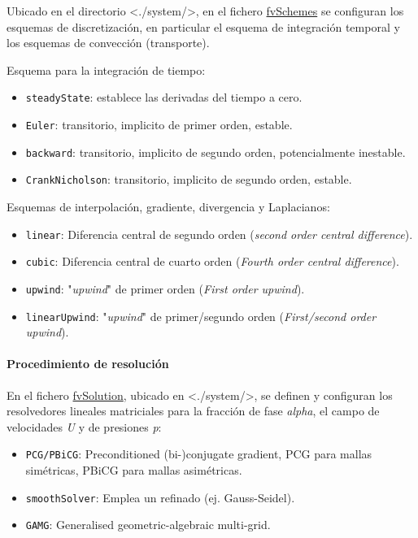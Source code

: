 Ubicado en el directorio \textless{}./system/\textgreater{}, en el
fichero
\href{http://cfd.direct/openfoam/user-guide/fvschemes/}{fvSchemes} se
configuran los esquemas de discretización, en particular el esquema de
integración temporal y los esquemas de convección (transporte).

Esquema para la integración de tiempo:

\begin{itemize}
\item
  \texttt{steadyState}: establece las derivadas del tiempo a cero.
\item
  \texttt{Euler}: transitorio, implicito de primer orden, estable.
\item
  \texttt{backward}: transitorio, implicito de segundo orden,
  potencialmente inestable.
\item
  \texttt{CrankNicholson}: transitorio, implicito de segundo orden,
  estable.
\end{itemize}

Esquemas de interpolación, gradiente, divergencia y Laplacianos:

\begin{itemize}
\item
  \texttt{linear}: Diferencia central de segundo orden (\emph{second
  order central difference}).
\item
  \texttt{cubic}: Diferencia central de cuarto orden (\emph{Fourth order
  central difference}).
\item
  \texttt{upwind}: "\emph{upwind}" de primer orden (\emph{First order
  upwind}).
\item
  \texttt{linearUpwind}: "\emph{upwind}" de primer/segundo orden
  (\emph{First/second order upwind}).
\end{itemize}

\paragraph{Procedimiento de resolución}\label{header-n233}

En el fichero
\href{http://cfd.direct/openfoam/user-guide/fvSolution/\#x20-1450004.5.1}{fvSolution},
ubicado en \textless{}./system/\textgreater{}, se definen y configuran
los resolvedores lineales matriciales para la fracción de fase
\emph{alpha}, el campo de velocidades \emph{U} y de presiones \emph{p}:

\begin{itemize}
\item
  \texttt{PCG/PBiCG}: Preconditioned (bi-)conjugate gradient, PCG para
  mallas simétricas, PBiCG para mallas asimétricas.
\item
  \texttt{smoothSolver}: Emplea un refinado (ej. Gauss-Seidel).
\item
  \texttt{GAMG}: Generalised geometric-algebraic multi-grid.
\end{itemize}


